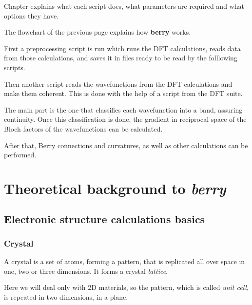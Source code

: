 \documentclass[a4paper,12pt]{report}
\begin{document}
Chapter  explains what each script does,
what parameters are required and what options they have.



The flowchart of the previous page explains how \textbf{berry} works.

First a preprocessing script is run which runs the DFT calculations, reads data from those
calculations, and saves it in files ready to be read by the folllowing scripts.

Then another script reads the wavefunctions from the DFT calculations and make them coherent.
This is done with the help of a script from the DFT suite.

The main part is the one that classifies each wavefunction into a band, assuring continuity.
Once this classification is done, the gradient in reciprocal space of the Bloch factors
of the wavefunctions can be calculated.

After that, Berry connections and curvatures, as well as other calculations can be performed.


\chapter{Theoretical background to \emph{berry}}

\section{Electronic structure calculations basics}

\subsection*{Crystal}
A crystal is a set of atoms, forming a pattern, that is replicated all over space in one, two or three dimensions.
It forms a crystal \emph{lattice}.

Here we will deal only with 2D materials, so the pattern, which is called \emph{unit cell},
is repeated in two dimensions, in a plane.
\end{document}
